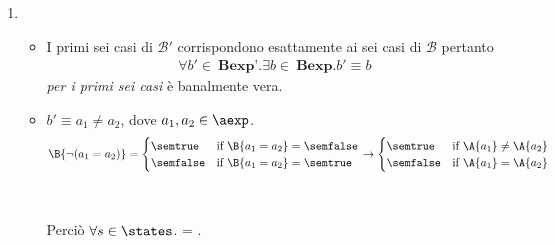 {\begin{enumerate}[label=(\alph*)]
   =
  \caseFun{\semtrue}
          {( = \semtrue \mbox{ and }  = \semtrue)
           \mbox{ or }
           ( = \semfalse \mbox{ and }  = \semfalse)}
          {\semfalse}
          {( = \semtrue \mbox{ or }  = \semtrue)
           \mbox{ and }
           ( = \semfalse \mbox{ or }  = \semfalse)}
          \\ \\

\item
  \begin{itemize}
    \item I primi sei casi di $\mathcal{B'}$ corrispondono esattamente ai sei
casi di $\mathcal{B}$ pertanto
      \begin{align*}
        \forall b' \in \ \textbf{Bexp'}.\exists b \in 
        \ \textbf{Bexp}.b' \equiv b
      \end{align*}
      \textit{per i primi sei casi} è banalmente vera.

    \item $b' \equiv a_1 \neq a_2$, dove $a_1, a_2 \in \aexp$. \\ 
      \begin{align*}
        \B{\lnot (a_1 = a_2)} =
        \begin{cases}
          \semtrue &
          \mbox{if} \ \B{a_1 = a_2} = \semfalse \\
          \semfalse &
          \mbox{if} \ \B{a_1 = a_2} = \semtrue \\
        \end{cases}
        \rightarrow
        \begin{cases}
          \semtrue &
          \mbox{if} \ \A{a_1} \neq  \A{a_2} \\
          \semfalse &
          \mbox{if} \ \A{a_1} = \A{a_2} \\
        \end{cases}
      \end{align*} \\ \\
      Perciò $\forall s \in \states$. = . \\


\end{itemize}
\end{enumerate}}

